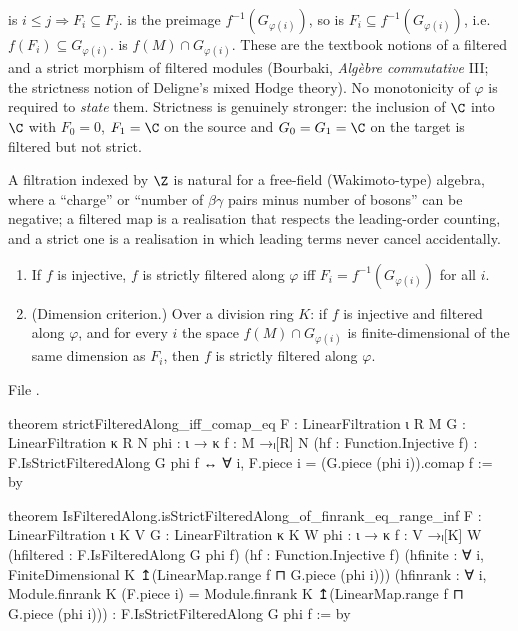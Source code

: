 \begin{dictionary}
 is $i\le j\Rightarrow F_i\subseteq F_j$. \allowbreak{}\allowbreak{} is the
preimage $f^{-1}(G_{\varphi(i)})$, so  is $F_i\subseteq f^{-1}(G_{\varphi(i)})$,
i.e.\ $f(F_i)\subseteq G_{\varphi(i)}$. \allowbreak{}\allowbreak{} is $f(M)\cap
G_{\varphi(i)}$. These are the textbook notions of a filtered and a strict morphism of filtered modules
(Bourbaki, \emph{Alg\`ebre commutative} III; the strictness notion of Deligne's mixed Hodge theory). No
monotonicity of $\varphi$ is required to \emph{state} them. Strictness is genuinely stronger: the
inclusion of $\C$ into $\C$ with $F_0 = 0$, $F_1=\C$ on the source and $G_0 = G_1 = \C$ on the target is
filtered but not strict.
\end{dictionary}

\begin{physics}
A filtration indexed by $\Z$ is natural for a free-field (Wakimoto-type) algebra, where a ``charge'' or ``number of $\beta\gamma$
pairs minus number of bosons'' can be negative; a filtered map is a realisation that respects the leading-order counting, and a
strict one is a realisation in which leading terms never cancel accidentally.
\end{physics}


\begin{theorem}\label{l11:thm:strict}
\begin{enumerate}
\item If $f$ is injective, $f$ is strictly filtered along $\varphi$ iff $F_i = f^{-1}(G_{\varphi(i)})$
  for all $i$.
\item (Dimension criterion.) Over a division ring $K$: if $f$ is injective and filtered along
  $\varphi$, and for every $i$ the space $f(M)\cap G_{\varphi(i)}$ is finite-dimensional of the same
  dimension as $F_i$, then $f$ is strictly filtered along $\varphi$.
\end{enumerate}
\end{theorem}
\noindent File .
\begin{leancode}
theorem strictFilteredAlong_iff_comap_eq
    {F : LinearFiltration ι R M} {G : LinearFiltration κ R N}
    {phi : ι → κ} {f : M →ₗ[R] N} (hf : Function.Injective f) :
    F.IsStrictFilteredAlong G phi f ↔
      ∀ i, F.piece i = (G.piece (phi i)).comap f := by

theorem IsFilteredAlong.isStrictFilteredAlong_of_finrank_eq_range_inf
    {F : LinearFiltration ι K V} {G : LinearFiltration κ K W}
    {phi : ι → κ} {f : V →ₗ[K] W}
    (hfiltered : F.IsFilteredAlong G phi f) (hf : Function.Injective f)
    (hfinite : ∀ i, FiniteDimensional K ↥(LinearMap.range f ⊓ G.piece (phi i)))
    (hfinrank : ∀ i, Module.finrank K (F.piece i) =
      Module.finrank K ↥(LinearMap.range f ⊓ G.piece (phi i))) :
    F.IsStrictFilteredAlong G phi f := by
\end{leancode}

